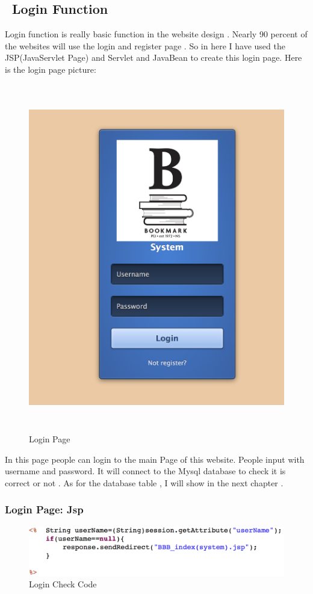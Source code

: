 \documentclass[12pt]{article}
\begin{document}
\cleardoublepage

\subsection{\ Login Function}
Login function is really basic function in the website design . Nearly 90 percent of the websites will use the login and register page . So in here I have used the JSP(JavaServlet Page)  and Servlet and JavaBean to create this login page. Here is the login page picture:
	\begin{figure}[H]
	\centering
		\includegraphics[height=6in]{images/loginPage.jpg} 
	\caption[Login page]{Login Page}
	\label{fig:loginPage}
\end{figure}
	In this page people can login to the main Page of this website.  People input with username and password. It will connect to the Mysql database to check it is correct or not . As for the database table ,  I will show in the next chapter .  
	\subsubsection{Login Page: Jsp}
\begin{figure}[H]
	\centering

		\includegraphics[width=15cm]{images/Check Login Code.jpg}
	\caption[Check Login Code]{Login Check Code}
	\label{fig:onlinetest}
\end{figure}
	
\end{document}
